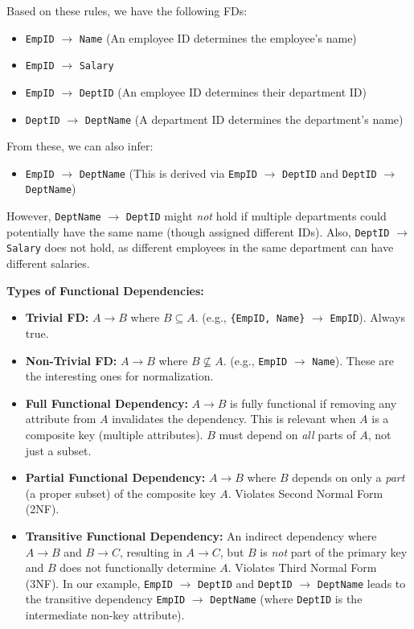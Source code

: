 \documentclass[12pt]{book}
\begin{document}
Based on these rules, we have the following FDs:
\begin{itemize}
    \item \texttt{EmpID} $\rightarrow$ \texttt{Name} (An employee ID determines the employee's name)
    \item \texttt{EmpID} $\rightarrow$ \texttt{Salary}
    \item \texttt{EmpID} $\rightarrow$ \texttt{DeptID} (An employee ID determines their department ID)
    \item \texttt{DeptID} $\rightarrow$ \texttt{DeptName} (A department ID determines the department's name)
\end{itemize}

From these, we can also infer:
\begin{itemize}
    \item \texttt{EmpID} $\rightarrow$ \texttt{DeptName} (This is derived via \texttt{EmpID} $\rightarrow$ \texttt{DeptID} and \texttt{DeptID} $\rightarrow$ \texttt{DeptName})
\end{itemize}

However, \texttt{DeptName} $\rightarrow$ \texttt{DeptID} might \emph{not} hold if multiple departments could potentially have the same name (though assigned different IDs). Also, \texttt{DeptID} $\rightarrow$ \texttt{Salary} does not hold, as different employees in the same department can have different salaries.

\textbf{Types of Functional Dependencies:}
\begin{itemize}
    \item \textbf{Trivial FD:} $A \rightarrow B$ where $B \subseteq A$. (e.g., \texttt{\{EmpID, Name\}} $\rightarrow$ \texttt{EmpID}). Always true.
    \item \textbf{Non-Trivial FD:} $A \rightarrow B$ where $B \not\subseteq A$. (e.g., \texttt{EmpID} $\rightarrow$ \texttt{Name}). These are the interesting ones for normalization.
    \item \textbf{Full Functional Dependency:} $A \rightarrow B$ is fully functional if removing any attribute from $A$ invalidates the dependency. This is relevant when $A$ is a composite key (multiple attributes). $B$ must depend on \emph{all} parts of $A$, not just a subset.
    \item \textbf{Partial Functional Dependency:} $A \rightarrow B$ where $B$ depends on only a \emph{part} (a proper subset) of the composite key $A$. Violates Second Normal Form (2NF).
    \item \textbf{Transitive Functional Dependency:} An indirect dependency where $A \rightarrow B$ and $B \rightarrow C$, resulting in $A \rightarrow C$, but $B$ is \emph{not} part of the primary key and $B$ does not functionally determine $A$. Violates Third Normal Form (3NF). In our example, \texttt{EmpID} $\rightarrow$ \texttt{DeptID} and \texttt{DeptID} $\rightarrow$ \texttt{DeptName} leads to the transitive dependency \texttt{EmpID} $\rightarrow$ \texttt{DeptName} (where \texttt{DeptID} is the intermediate non-key attribute).
\end{itemize}
\end{document}
